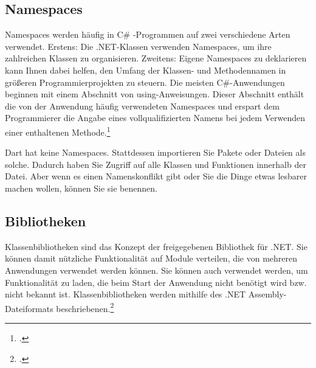 \begin{minipage}{\linewidth}

\end{minipage}

\subsection{Namespaces}

Namespaces werden häufig in C\# -Programmen auf zwei verschiedene Arten verwendet. Erstens: Die .NET-Klassen verwenden Namespaces, um ihre zahlreichen Klassen zu organisieren. Zweitens: Eigene Namespaces zu deklarieren kann Ihnen dabei helfen, den Umfang der Klassen- und Methodennamen in größeren Programmierprojekten zu steuern.
Die meisten C\#-Anwendungen beginnen mit einem Abschnitt von using-Anweisungen. Dieser Abschnitt enthält die von der Anwendung häufig verwendeten Namespaces und erspart dem Programmierer die Angabe eines vollqualifizierten Namens bei jedem Verwenden einer enthaltenen Methode.\footcite[Vgl.  Verwenden von Namespaces (C\#-Programmierhandbuch)][Abgerufen am \today]{GoogleFlutterSharedPreferences2020} 



Dart hat keine Namespaces. Stattdessen importieren Sie Pakete oder Dateien als solche.
Dadurch haben Sie Zugriff auf alle Klassen und Funktionen innerhalb der Datei. Aber wenn es einen Namenskonflikt gibt oder Sie die Dinge etwas lesbarer machen wollen, können Sie sie benennen.

\begin{minipage}{\linewidth}

\end{minipage}

\subsection{Bibliotheken}

Klassenbibliotheken sind das Konzept der freigegebenen Bibliothek für .NET. Sie können damit nützliche Funktionalität auf Module verteilen, die von mehreren Anwendungen verwendet werden können. Sie können auch verwendet werden, um Funktionalität zu laden, die beim Start der Anwendung nicht benötigt wird bzw. nicht bekannt ist. Klassenbibliotheken werden mithilfe des .NET Assembly-Dateiformats beschriebenen.\footcite[Vgl. .NET-Klassenbibliotheken
][Abgerufen am \today]{GoogleFlutterSharedPreferences2020} 

